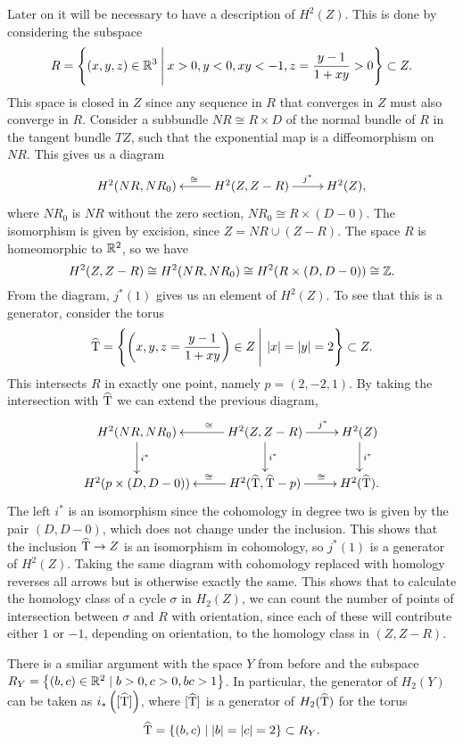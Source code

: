 Later on it will be necessary to have a description of $H^2(Z)$. This
is done by considering the subspace
\[ R = \left\{ (x,y,z) \in \mathbb{R}^3 \:\Bigg\vert\: x > 0, y < 0, xy < -1, z =
  \frac{y-1}{1+xy}>0  \right\} \subset Z. \]
This space is closed in $Z$ since any sequence in $R$ that converges
in $Z$ must also converge in $R$.
Consider a subbundle $NR \cong R\times D$ of the normal
bundle of $R$
in the tangent bundle $TZ$, such that the exponential map is a
diffeomorphism on $NR$. This gives us a diagram
\[ \xymatrix{ H^2(NR,NR_0) & H^2(Z,Z-R) \ar[l]_\cong \ar[r]^>>>>>{j^*} &
  H^2(Z), } \]
where $NR_0$ is $NR$ without the zero section, $NR_0 \cong
R\times(D-0)$. The isomorphism is given by excision, since $Z = NR
\cup (Z-R)$. The space $R$ is homeomorphic to $\mathbb{R}^2$, so we have 
\[ H^2(Z,Z-R) \cong H^2(NR,NR_0) \cong H^2(R\times (D,D-0)) \cong
\mathbb{Z}. \] 
From the diagram, $j^*(1)$ gives us an element of $H^2(Z)$. To see
that this is a generator, consider the torus 
\[ \widehat {\operatorname{T}} = \left\{ \left(x,y,z=\frac{y-1}{1+xy}\right)\in Z \:\Bigg\vert\:
  \left| x \right| = \left| y \right| = 2  \right\}
\subset Z. \]
This intersects $R$ in exactly one point, namely $p=(2,-2,1)$. By
taking the intersection with $\widehat{\operatorname{T}}$ we can extend the previous
diagram,
\[ \xymatrix{ H^2(NR,NR_0) \ar[d]^-{i^*} & H^2(Z,Z-R) \ar[d]^-{i^*}
  \ar[l]_<<<<<\cong \ar[r]^>>>>>{j^*} & H^2(Z) \ar[d]^-{i^*} \\
  H^2(p\times (D,D-0)) & H^2(\widehat \T,\widehat \T-p)
  \ar[r]^>>>>>{\cong} \ar[l]_>>>>>\cong & H^2(\widehat \T).
} \]
The left $i^*$ is an isomorphism since the cohomology in degree two is
given by the pair $(D,D-0)$, which does not change under the
inclusion. This shows that the inclusion $\widehat {\operatorname{T}} \to Z$ is an
isomorphism in cohomology, so $j^*(1)$ is a generator of
$H^2(Z)$. Taking the same diagram with cohomology replaced with
homology reverses all arrows but is otherwise exactly the same. This
shows that to calculate the homology class of a cycle $\sigma$ in
$H_2(Z)$, we can count the number of points of intersection between
$\sigma$ and $R$ with orientation, since each of these will contribute
either $1$ or $-1$, depending on orientation, to the homology class in
$(Z,Z-R)$.

There is a smiliar argument with the space $Y$ from before and the
subspace ${R_Y = \left\{ (b,c) \in \mathbb{R}^2 \mid b > 0, c > 0, bc > 1 \right\}}$. In
particular, the generator of $H_2(Y)$ can be taken as
$i_*\left([\widehat {\operatorname{T}}]\right)$, where $[\widehat
  {\operatorname{T}}]$ is a generator of $H_2(\widehat {\operatorname{T}})$ for the torus 
\[ {\widehat {\operatorname{T}} = \left\{ (b,c)\mid \left| b \right|=\left| c \right| = 2 \right\}} \subset
R_Y. \]

